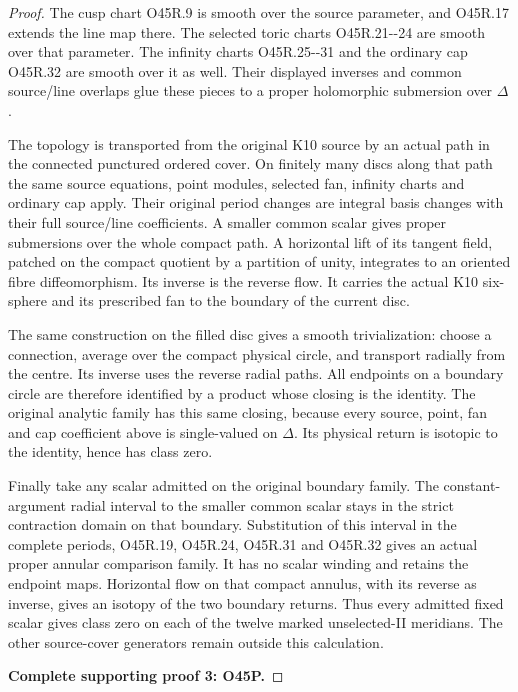\begin{proof}
The cusp chart O45R.9 is
smooth over the source
parameter, and O45R.17
extends the line map there.
The selected toric charts
O45R.21-\/-24 are smooth
over that parameter.
The infinity charts
O45R.25-\/-31 and the
ordinary cap O45R.32
are smooth over it as well.
Their displayed inverses
and common source/line
overlaps glue these pieces
to a proper holomorphic
submersion over
\(\Delta\).

The topology is transported
from the original K10
source by an actual path
in the connected punctured
ordered cover. On finitely
many discs along that path
the same source equations,
point modules, selected
fan, infinity charts and
ordinary cap apply.
Their original period
changes are integral
basis changes with their
full source/line
coefficients. A smaller
common scalar gives
proper submersions
over the whole compact
path. A horizontal lift
of its tangent field,
patched on the compact
quotient by a partition
of unity, integrates to
an oriented fibre
diffeomorphism. Its
inverse is the reverse
flow. It carries the
actual K10 six-sphere
and its prescribed
fan to the boundary
of the current disc.

The same construction on
the filled disc gives a
smooth trivialization:
choose a connection,
average over the compact
physical circle, and
transport radially
from the centre.
Its inverse uses the
reverse radial paths.
All endpoints on a
boundary circle are
therefore identified
by a product whose
closing is the
identity. The original
analytic family has
this same closing,
because every source,
point, fan and cap
coefficient above is
single-valued on
\(\Delta\).
Its physical return
is isotopic to the
identity, hence has
class zero.

Finally take any scalar
admitted on the original
boundary family. The
constant-argument radial
interval to the smaller
common scalar stays in
the strict contraction
domain on that boundary.
Substitution of this
interval in the complete
periods, O45R.19,
O45R.24, O45R.31 and
O45R.32 gives an
actual proper annular
comparison family.
It has no scalar
winding and retains
the endpoint maps.
Horizontal flow on
that compact annulus,
with its reverse as
inverse, gives an
isotopy of the two
boundary returns.
Thus every admitted
fixed scalar gives
class zero on each
of the twelve marked
unselected-II
meridians. The other
source-cover
generators remain
outside this
calculation.



\par\bigskip\noindent\textbf{Complete supporting proof 3: O45P.}\par



\end{proof}
